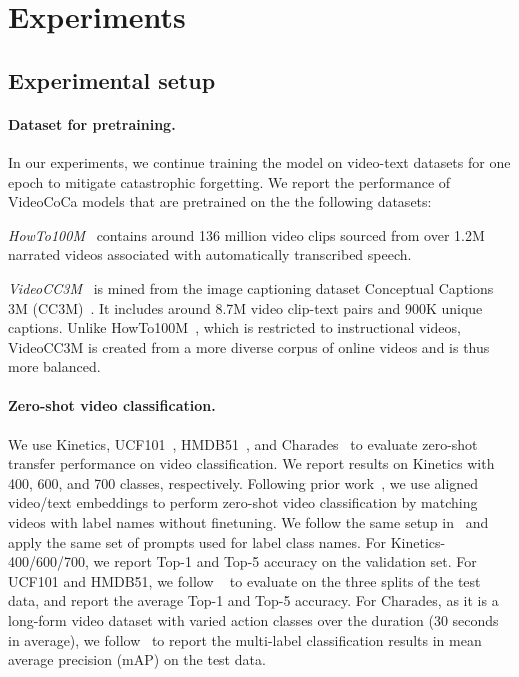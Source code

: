 \section{Experiments}
\label{sec:experiments}



\subsection{Experimental setup}
\label{sec:experiments_setup}

\paragraph{Dataset for pretraining.} \label{sec:experiments_setup_upstream} In our experiments, we continue training the model on video-text datasets for one epoch to mitigate catastrophic forgetting. We report the performance of VideoCoCa models that are pretrained on the the following datasets:

\emph{HowTo100M}~\cite{miech2019howto100m} contains around 136 million video clips sourced from over 1.2M narrated videos associated with automatically transcribed speech.

\emph{VideoCC3M}~\cite{nagrani2022learning} is mined from the image captioning dataset Conceptual Captions 3M (CC3M)~\cite{sharma2018cc3m}. It includes around 8.7M video clip-text pairs and 900K unique captions. Unlike HowTo100M~\cite{miech2019howto100m}, which is restricted to instructional videos, VideoCC3M is created from a more diverse corpus of online videos and is thus more balanced. 






\vspace{-2mm}
\paragraph{Zero-shot video classification.}
\label{sec:experiments_setup_zeroshot_video_classification}
We use Kinetics\cite{kay_arxiv_2017}, UCF101~\cite{soomro2012ucf101}, HMDB51~\cite{kuehne2011hmdb}, and Charades~\cite{sigurdsson2016hollywood} to evaluate zero-shot transfer performance on video classification. We report results on Kinetics with 400, 600, and 700 classes, respectively. Following prior work~\cite{radford21clip,jia2021scaling}, we use aligned video/text embeddings to perform zero-shot video classification by matching videos with label names without
finetuning. We follow the same setup in~\cite{radford21clip} and apply the same set of prompts used for label class names. For Kinetics-400/600/700, we report Top-1 and Top-5 accuracy on the validation set. For UCF101 and HMDB51, we follow ~\cite{radford21clip,ni2022XCLIP} to evaluate on the three splits of the test data, and report the average Top-1 and Top-5 accuracy. For Charades, as it is a long-form video dataset with varied action classes over the duration (30 seconds in average), we follow~\cite{wang2021actionclip,bain2022cliphitchhikers} to report the multi-label classification results in mean average precision (mAP) on the test data. 

